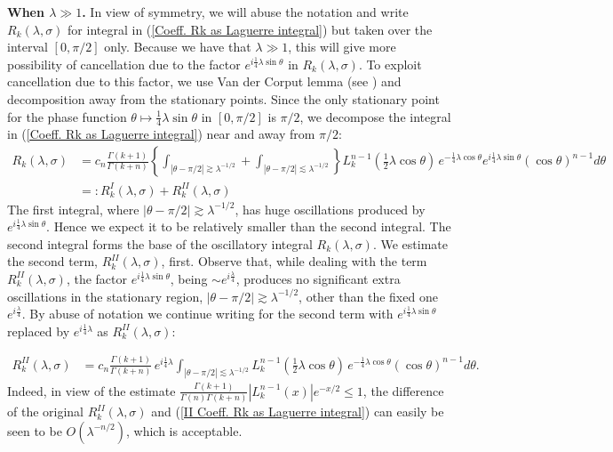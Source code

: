 \documentclass[11pt, reqno]{amsart}
\theoremstyle{plain}
\theoremstyle{remark}
\theoremstyle{example}
\theoremstyle{definition}
\numberwithin{equation}{section}
\begin{document}
\noindent \textbf{When $\lambda \gg 1$.}  In view of symmetry, we will abuse the notation and write $R_{k}(\lambda, \sigma)$ for integral in (\ref{Coeff. Rk as Laguerre integral}) but taken over the interval $[0, \pi/2]$ only. Because we have that $\lambda \gg 1$, this will give more possibility of cancellation due to the factor $ e^{i \frac{1}{4} \lambda \sin{\theta}}$ in $R_{k}(\lambda, \sigma)$. To exploit cancellation due to this factor, we use Van der Corput lemma (see ) and decomposition away from the stationary points. Since the only stationary point for the phase function $\theta \mapsto \frac{1}{4} \lambda \sin{\theta}$ in $[0, \pi/2]$ is $ \pi/2$, we decompose the integral in (\ref{Coeff. Rk as Laguerre integral}) near and away from $ \pi/2$:
\begin{equation}\label{I plus II Coeff. Rk as Laguerre integral}
   \begin{split}
         R_{k}  (\lambda, \sigma) 
        & = c_{n} \frac{\Gamma(k+1)}{\Gamma(k+n)}  \left\lbrace  \int_{ |\theta - \pi/2| \gtrsim \lambda^{-1/2}} +  \int_{ |\theta - \pi/2| \lesssim \lambda^{-1/2}} \right\rbrace L_{k}^{n-1} \left( {\textstyle\frac{1}{2} } \lambda  \cos{\theta}  \right) \, e^{ - \frac{1}{4} \lambda \cos{\theta}}  e^{i \frac{1}{4} \lambda \sin{\theta}} (\cos{\theta})^{n-1} d \theta \\
        & =:  R_{k}^{I}(\lambda, \sigma) + R_{k}^{II}(\lambda, \sigma)
   \end{split}
\end{equation}
The first integral, where $  |\theta - \pi/2| \gtrsim \lambda^{-1/2} $, has huge oscillations produced by $ e^{i \frac{1}{4} \lambda \sin{\theta}}$. Hence we expect it to be relatively smaller than the second integral. The second integral  forms the base of the oscillatory integral $R_{k}(\lambda, \sigma)$.  We estimate the second term, $R_{k}^{II}(\lambda, \sigma)$, first.   Observe that, while dealing with the term $R_{k}^{II}(\lambda, \sigma)$, the factor $ e^{i \frac{1}{4} \lambda \sin{\theta}}$, being $\sim e^{i \frac{\lambda}{4}}$, produces no significant extra oscillations in the stationary region, $  |\theta - \pi/2| \gtrsim \lambda^{-1/2} $,  other than the fixed one $e^{i \frac{\lambda}{4}}$. By abuse of notation we continue writing for the  second term with $ e^{i \frac{1}{4} \lambda \sin{\theta}}$ replaced by $ e^{i \frac{1}{4} \lambda}$  as $R_{k}^{II}(\lambda, \sigma)$: 

\begin{equation}\label{II Coeff. Rk as Laguerre integral}
   \begin{split}
        R_{k}^{II}(\lambda, \sigma)
        & = c_{n} \frac{\Gamma(k+1)}{\Gamma(k+n)} \,  e^{i \frac{1}{4} \lambda}  \int_{ |\theta - \pi/2| \lesssim \lambda^{-1/2}}  L_{k}^{n-1} \left( {\textstyle\frac{1}{2} } \lambda  \cos{\theta}  \right) \, e^{-\frac{1}{4} \lambda \cos{\theta}}   (\cos{\theta})^{n-1} d \theta.
   \end{split}
\end{equation}
Indeed, in view of the estimate $ \frac{\Gamma(k+1)}{\Gamma(n)\Gamma(k+n)} |L_{k}^{n-1}(x)| e^{-x/2}   \leq 1$, the difference of the original $R_{k}^{II}(\lambda, \sigma)$ and (\ref{II Coeff. Rk as Laguerre integral}) can easily be seen to be $O(\lambda^{-n/2})$, which is acceptable.
\end{document}
